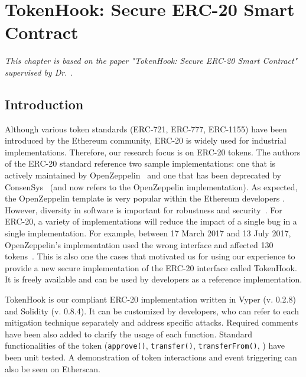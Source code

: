 
\chapter{TokenHook: Secure ERC-20 Smart Contract}\label{ch:tokenhook}

\textit{This chapter is based on the paper "TokenHook: Secure ERC-20 Smart Contract"~\cite{token2021} supervised by Dr. \supv.}
	
\section{Introduction}
Although various token standards (\eg ERC-721, ERC-777, ERC-1155) have been introduced by the Ethereum community, ERC-20 is widely used for industrial implementations. Therefore, our research focus is on ERC-20 tokens. The authors of the ERC-20 standard reference two sample implementations: one that is actively maintained by OpenZeppelin~\cite{OpenZeppelin_Token} and one that has been deprecated by ConsenSys~\cite{ConsenSys_Token} (and now refers to the OpenZeppelin implementation). As expected, the OpenZeppelin template is very popular within the Ethereum developers \cite{OpenZeppelin1,OpenZeppelin2,OpenZeppelin3}. However, diversity in software is important for robustness and security~\cite{FSA97,FHS97}. For ERC-20, a variety of implementations will reduce the impact of a single bug in a single implementation. For example, between 17 March 2017 and 13 July 2017, OpenZeppelin's implementation used the wrong interface and affected 130 tokens~\cite{TokenBug}. This is also one the cases that motivated us for using our experience to provide a new secure implementation of the ERC-20 interface called TokenHook. It is freely available and can be used by developers as a reference implementation.

TokenHook is our compliant ERC-20 implementation written in Vyper (v. 0.2.8) and Solidity (v. 0.8.4). It can be customized by developers, who can refer to each mitigation technique separately and address specific attacks. Required comments have been also added to clarify the usage of each function. Standard functionalities of the token (\ie   \texttt{approve()}, \texttt{transfer()}, \texttt{transferFrom()}, \etc) have been unit tested. A demonstration of token interactions and event triggering can also be seen on Etherscan. 

